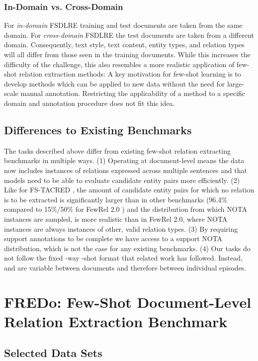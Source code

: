 \documentclass[11pt]{article}
\begin{document}
\subsubsection{In-Domain vs. Cross-Domain}
For \textit{in-domain} FSDLRE training and test documents are taken from the same domain. 
For \textit{cross-domain} FSDLRE the test documents are taken from a different domain. 
Consequently, text style, text content, entity types, and relation types will all differ from those seen in the training documents. While this increases the difficulty of the challenge, this also resembles a more realistic application of few-shot relation extraction methods:
A key motivation for few-shot learning is to develop methods which can be applied to new data without the need for large-scale manual annotation. Restricting the applicability of a method to a specific domain and annotation procedure does not fit this idea.

\subsection{Differences to Existing Benchmarks}
The tasks described above differ from existing few-shot relation extracting benchmarks in multiple ways.
(1) Operating at document-level means the data now includes instances of relations expressed across multiple sentences and that models need to be able to evaluate candidate entity pairs more efficiently.
(2) Like for FS-TACRED \cite{sabo_revisiting_2021}, the amount of candidate entity pairs for which no relation is to be extracted is significantly larger than in other benchmarks (96.4\% compared to 15\%/50\% for FewRel 2.0 \cite{gao_fewrel_2019}) and the distribution from which NOTA instances are sampled, is more realistic than in FewRel 2.0, where NOTA instances are always instances of other, valid relation types.
(3) By requiring support annotations to be complete we have access to a support NOTA distribution, which is not the case for any existing benchmarks.
(4) Our tasks do not follow the fixed -way -shot format that related work has followed. Instead,  and  are variable between documents and therefore between individual episodes. 




\section{FREDo: Few-Shot Document-Level Relation Extraction Benchmark}
\label{sec:benchmark}
\subsection{Selected Data Sets}
\end{document}
